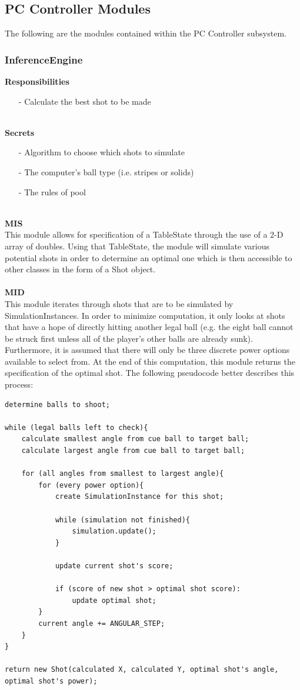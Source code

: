 \documentclass[titlepage]{article}
\begin{document}
\subsection{PC Controller Modules}
The following are the modules contained within the PC Controller subsystem.
\subsubsection{InferenceEngine}
\textbf{Responsibilities}
\begin{itemize}
	\item[-] Calculate the best shot to be made
\end{itemize}~\\
\textbf{Secrets}
\begin{itemize}
	\item[-] Algorithm to choose which shots to simulate
	\item[-] The computer's ball type (i.e. stripes or solids)
	\item[-] The rules of pool
\end{itemize}~\\
\textbf{MIS}\\[2mm]
This module allows for specification of a TableState through the use of a 2-D array of doubles. Using that TableState, the module will simulate various potential shots in order to determine an optimal one which is then accessible to other classes in the form of a Shot object.
\\\\
\textbf{MID}\\[2mm]
This module iterates through shots that are to be simulated by SimulationInstances. In order to minimize computation, it only looks at shots that have a hope of directly hitting another legal ball (e.g. the eight ball cannot be struck first unless all of the player's other balls are already sunk). Furthermore, it is assumed that there will only be three discrete power options available to select from. At the end of this computation, this module returns the specification of the optimal shot.
\newpage
The following pseudocode better describes this process:
\begin{lstlisting}
determine balls to shoot;

while (legal balls left to check){
	calculate smallest angle from cue ball to target ball;
	calculate largest angle from cue ball to target ball;
	
	for (all angles from smallest to largest angle){
		for (every power option){
			create SimulationInstance for this shot;
			
			while (simulation not finished){
				simulation.update();
			}
			
			update current shot's score;
			
			if (score of new shot > optimal shot score):
				update optimal shot;
		}		
		current angle += ANGULAR_STEP;
	}
}

return new Shot(calculated X, calculated Y, optimal shot's angle, optimal shot's power);
\end{lstlisting}~\\[-10mm]
\end{document}
